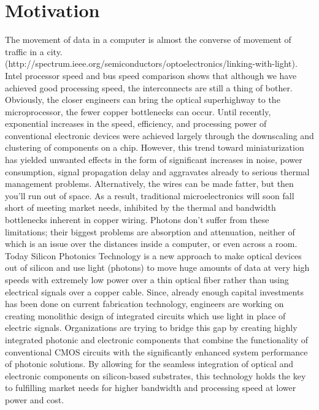 \documentclass[../main.tex]{subfiles}
\begin{document}
	\section{Motivation}
The movement of data in a computer is almost the converse of movement of traffic in a city.	(http://spectrum.ieee.org/semiconductors/optoelectronics/linking-with-light). Intel processor speed and bus speed comparison shows that although we have achieved good processing speed, the interconnects are still a thing of bother. Obviously, the closer engineers can bring the optical superhighway to the microprocessor, the fewer copper bottlenecks can occur. Until recently, exponential increases in the speed, efficiency, and processing power of conventional electronic devices were achieved largely through the downscaling and clustering of components on a chip. However, this trend toward miniaturization has yielded unwanted effects in the form of significant increases in noise, power consumption, signal propagation delay and aggravates already to serious thermal management problems. Alternatively, the wires can be made fatter, but then you'll run out of space.  As a result, traditional microelectronics will soon fall short of meeting market needs, inhibited by the thermal and bandwidth bottlenecks inherent in copper wiring. Photons don't suffer from these limitations; their biggest problems are absorption and attenuation, neither of which is an issue over the distances inside a computer, or even across a room. Today Silicon Photonics Technology is a new approach to make optical devices out of silicon and use light (photons) to move huge amounts of data at very high speeds with extremely low power over a thin optical fiber rather than using electrical signals over a copper cable. Since, already enough capital investments has been done on current fabrication technology, engineers are working on creating monolithic design of integrated circuits which use light in place of electric signals. Organizations are trying to bridge this gap by creating highly integrated photonic and electronic components that combine the functionality of conventional CMOS circuits with the significantly enhanced system performance of photonic solutions. By allowing for the seamless integration of optical and electronic components on silicon-based substrates, this technology holds the key to fulfilling market needs for higher bandwidth and processing speed at lower power and cost.
\end{document}
